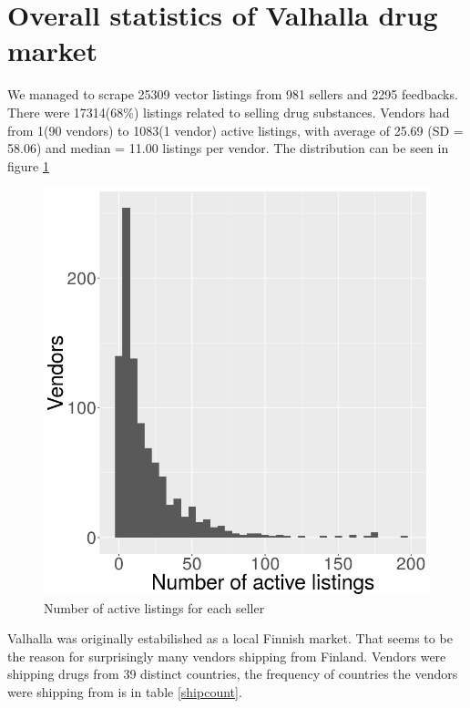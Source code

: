 \documentclass[
  digital, %
  table,   %
  lof,     %
  lot,     %
  oneside
]{fithesis3}
\begin{document}
\section{Overall statistics of Valhalla drug market}

We managed to scrape 25309 vector listings from 981 sellers and 
2295 feedbacks. There were 17314(68\%) listings related to selling drug substances.
Vendors had from 1(90 vendors) to 1083(1 vendor)
active listings, with average of 25.69 (SD = 58.06) and median = 11.00 listings per vendor.
The distribution can be seen in figure \ref{listingsxsellers}

\begin{figure}[!htb]
    \centering
    \includegraphics[scale=0.4]{listingsxsellers}
    \caption{Number of active listings for each seller}
    \label{listingsxsellers}
\end{figure}

Valhalla was originally estabilished as a local Finnish market.
That seems to be the reason for surprisingly many vendors shipping from Finland.
Vendors were shipping drugs from 39 distinct countries,
the frequency of countries the vendors were shipping from is in table \ref{shipcount}.
\end{document}
